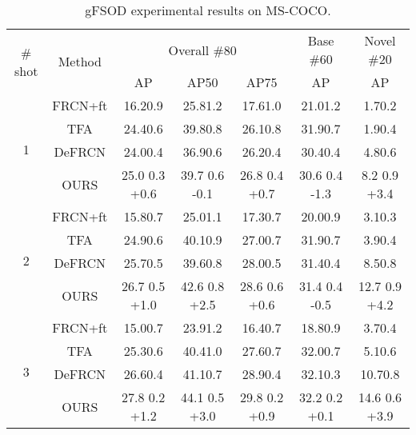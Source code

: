 \documentclass{article}
\begin{document}
\begin{table}[hbt!]
    \caption{gFSOD experimental results on MS-COCO.}
    \centering
    \begin{tabular}{c|c|ccc|c|c}
        \toprule
         \multirow{2}{*}{\# shot} & \multirow{2}{*}{Method} & \multicolumn{3}{c|}{Overall \#80} &Base \#60 & Novel \#20  \\
         && AP & AP50 &AP75 & AP&AP \\
         \hline
         \multirow{4}{*}{1} & FRCN+ft \cite{metarcnn} & 16.20.9& 25.81.2 &17.61.0 & 21.01.2 & 1.70.2 \\
         & TFA \cite{tfa} & 24.40.6 & 39.80.8 & 26.10.8 & 31.90.7 & 1.90.4 \\
         & DeFRCN \cite{defrcn} & 24.00.4 & 36.90.6 & 26.20.4 & 30.40.4 & 4.80.6 \\
         & \cellcolor{gray!30} OURS & \cellcolor{gray!30} 25.0  0.3  {\scriptsize \color{red}+0.6}& \cellcolor{gray!30}39.7  0.6  {\scriptsize \color{blue}-0.1}&\cellcolor{gray!30} 26.8 0.4 {\scriptsize \color{red}+0.7}& \cellcolor{gray!30}30.6 0.4 {\scriptsize \color{blue}-1.3}&\cellcolor{gray!30} 8.2  0.9 {\scriptsize \color{red}+3.4}\\
         \hline
         \multirow{4}{*}{2} & FRCN+ft \cite{metarcnn} & 15.80.7& 25.01.1 &17.30.7 & 20.00.9 & 3.10.3 \\
         & TFA \cite{tfa} & 24.90.6 & 40.10.9 & 27.00.7 & 31.90.7 & 3.90.4 \\
         & DeFRCN \cite{defrcn}& 25.70.5 & 39.60.8 & 28.00.5 & 31.40.4 & 8.50.8 \\
         & \cellcolor{gray!30}OURS & \cellcolor{gray!30}26.7  0.5 {\scriptsize \color{red}+1.0}& \cellcolor{gray!30}42.6  0.8 {\scriptsize \color{red}+2.5}& \cellcolor{gray!30}28.6  0.6 {\scriptsize \color{red}+0.6}& \cellcolor{gray!30}31.4  0.4 {\scriptsize \color{blue}-0.5}& \cellcolor{gray!30}12.7  0.9 {\scriptsize \color{red}+4.2}\\
         \hline
         \multirow{4}{*}{3} & FRCN+ft \cite{metarcnn} & 15.00.7& 23.91.2 &16.40.7 & 18.80.9 & 3.70.4 \\
         & TFA \cite{tfa} & 25.30.6 & 40.41.0 & 27.60.7 & 32.00.7 & 5.10.6 \\
         & DeFRCN \cite{defrcn}& 26.60.4 & 41.10.7 & 28.90.4 & 32.10.3 & 10.70.8 \\
         & \cellcolor{gray!30} OURS & \cellcolor{gray!30} 27.8  0.2 {\scriptsize \color{red}+1.2} & \cellcolor{gray!30} 44.1 0.5 {\scriptsize \color{red}+3.0}& \cellcolor{gray!30} 29.8 0.2 {\scriptsize \color{red}+0.9}& \cellcolor{gray!30}32.2 0.2 {\scriptsize \color{red}+0.1}&\cellcolor{gray!30} 14.6 0.6 {\scriptsize \color{red}+3.9}\\

\end{tabular}
\end{table}
\end{document}

